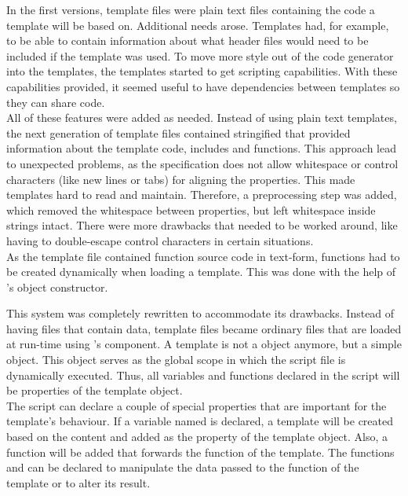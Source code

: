 In the first versions, template files were plain text files containing the code a  template will be based on. Additional needs arose. Templates had, for example, to be able to contain information about what  header files would need to be included if the template was used. To move more style out of the code generator into the templates, the templates started to get scripting capabilities. With these capabilities provided, it seemed useful to have dependencies between templates so they can share code.\\
All of these features were added as needed. Instead of using plain text templates, the next generation of template files contained stringified  that provided information about the template code, includes and functions. This approach lead to unexpected problems, as the  specification does not allow whitespace or control characters (like new lines or tabs) for aligning the  properties. This made templates hard to read and maintain. Therefore, a preprocessing step was added, which removed the whitespace between properties, but left whitespace inside strings intact. There were more drawbacks that needed to be worked around, like having to double-escape control characters in certain situations.
\\As the template file contained function source code in text-form, functions had to be created dynamically when loading a template. This was done with the help of 's  object constructor.

This system was completely rewritten to accommodate its drawbacks. Instead of having files that contain  data, template files became ordinary  files that are loaded at run-time using 's  component. A template is not a  object anymore, but a simple  object. This object serves as the global scope in which the script file is dynamically executed. Thus, all variables and functions declared in the script will be properties of the template object.\\
The script can declare a couple of special properties that are important for the template's behaviour. If a variable named  is declared, a  template will be created based on the content and added as the  property of the template object. Also, a  function will be added that forwards the  function of the  template. The functions  and  can be declared to manipulate the data passed to the  function of the  template or to alter its result.

